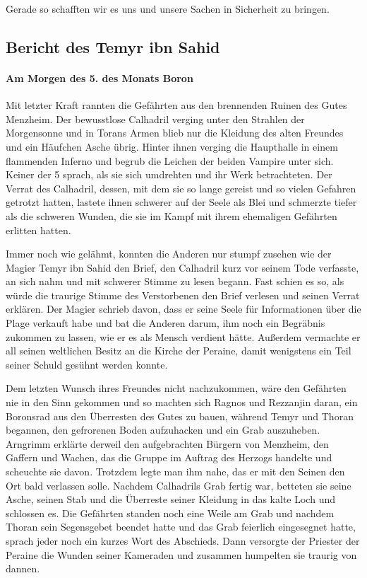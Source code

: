 Gerade so schafften wir es uns und unsere Sachen in Sicherheit zu bringen. 


\subsection{Bericht des Temyr ibn Sahid}

\paragraph{Am Morgen des 5. des Monats Boron}
Mit letzter Kraft rannten die Gefährten aus den brennenden Ruinen des Gutes Menzheim. Der bewusstlose Calhadril verging unter den Strahlen der Morgensonne und in Torans Armen blieb nur die Kleidung des alten Freundes und ein Häufchen Asche übrig. Hinter ihnen verging die Haupthalle in einem flammenden Inferno und begrub die Leichen der beiden Vampire unter sich. Keiner der 5 sprach, als sie sich umdrehten und ihr Werk betrachteten. Der Verrat des Calhadril, dessen, mit dem sie so lange gereist und so vielen Gefahren getrotzt hatten, lastete ihnen schwerer auf der Seele als Blei und schmerzte tiefer als die schweren Wunden, die sie im Kampf mit ihrem ehemaligen Gefährten erlitten hatten.

Immer noch wie gelähmt, konnten die Anderen nur stumpf zusehen wie der Magier Temyr ibn Sahid den Brief, den Calhadril kurz vor seinem Tode verfasste, an sich nahm und mit schwerer Stimme zu lesen begann. Fast schien es so, als würde die traurige Stimme des Verstorbenen den Brief verlesen und seinen Verrat erklären. Der Magier schrieb davon, dass er seine Seele für Informationen über die Plage verkauft habe und bat die Anderen darum, ihm noch ein Begräbnis zukommen zu lassen, wie er es als Mensch verdient hätte. Außerdem vermachte er all seinen weltlichen Besitz an die Kirche der Peraine, damit wenigstens ein Teil seiner Schuld gesühnt werden konnte.

Dem letzten Wunsch ihres Freundes nicht nachzukommen, wäre den Gefährten nie in den Sinn gekommen und so machten sich Ragnos und Rezzanjin daran, ein Boronsrad aus den Überresten des Gutes zu bauen, während Temyr und Thoran begannen, den gefrorenen Boden aufzuhacken und ein Grab auszuheben. Arngrimm erklärte derweil den aufgebrachten Bürgern von Menzheim, den Gaffern und Wachen, das die Gruppe im Auftrag des Herzogs handelte und scheuchte sie davon. Trotzdem legte man ihm nahe, das er mit den Seinen den Ort bald verlassen solle. Nachdem Calhadrils Grab fertig war, betteten sie seine Asche, seinen Stab und die Überreste seiner Kleidung in das kalte Loch und schlossen es. Die Gefährten standen noch eine Weile am Grab und nachdem Thoran sein Segensgebet beendet hatte und das Grab feierlich eingesegnet hatte, sprach jeder noch ein kurzes Wort des Abschieds. Dann versorgte der Priester der Peraine die Wunden seiner Kameraden und zusammen humpelten sie traurig von dannen.

